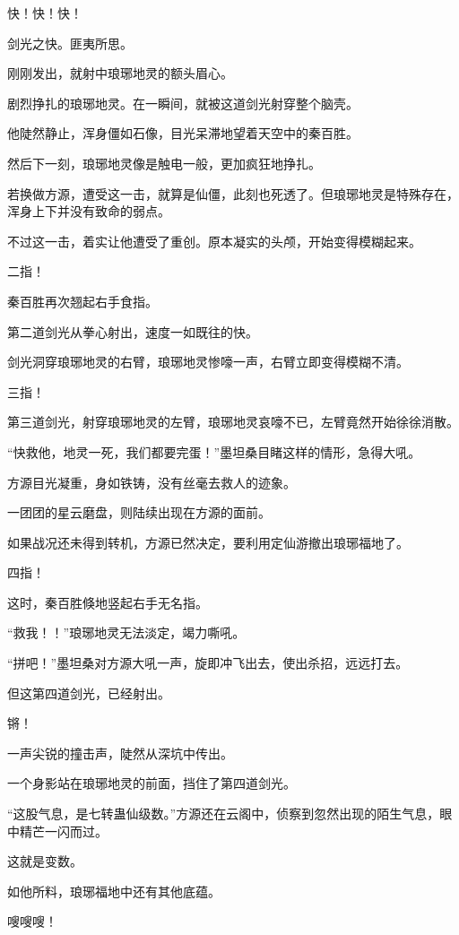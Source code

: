 \begin{this_body}
快！快！快！

剑光之快。匪夷所思。

刚刚发出，就射中琅琊地灵的额头眉心。

剧烈挣扎的琅琊地灵。在一瞬间，就被这道剑光射穿整个脑壳。

他陡然静止，浑身僵如石像，目光呆滞地望着天空中的秦百胜。

然后下一刻，琅琊地灵像是触电一般，更加疯狂地挣扎。

若换做方源，遭受这一击，就算是仙僵，此刻也死透了。但琅琊地灵是特殊存在，浑身上下并没有致命的弱点。

不过这一击，着实让他遭受了重创。原本凝实的头颅，开始变得模糊起来。

二指！

秦百胜再次翘起右手食指。

第二道剑光从拳心射出，速度一如既往的快。

剑光洞穿琅琊地灵的右臂，琅琊地灵惨嚎一声，右臂立即变得模糊不清。

三指！

第三道剑光，射穿琅琊地灵的左臂，琅琊地灵哀嚎不已，左臂竟然开始徐徐消散。

“快救他，地灵一死，我们都要完蛋！”墨坦桑目睹这样的情形，急得大吼。

方源目光凝重，身如铁铸，没有丝毫去救人的迹象。

一团团的星云磨盘，则陆续出现在方源的面前。

如果战况还未得到转机，方源已然决定，要利用定仙游撤出琅琊福地了。

四指！

这时，秦百胜倏地竖起右手无名指。

“救我！！”琅琊地灵无法淡定，竭力嘶吼。

“拼吧！”墨坦桑对方源大吼一声，旋即冲飞出去，使出杀招，远远打去。

但这第四道剑光，已经射出。

锵！

一声尖锐的撞击声，陡然从深坑中传出。

一个身影站在琅琊地灵的前面，挡住了第四道剑光。

“这股气息，是七转蛊仙级数。”方源还在云阁中，侦察到忽然出现的陌生气息，眼中精芒一闪而过。

这就是变数。

如他所料，琅琊福地中还有其他底蕴。

嗖嗖嗖！


\end{this_body}
